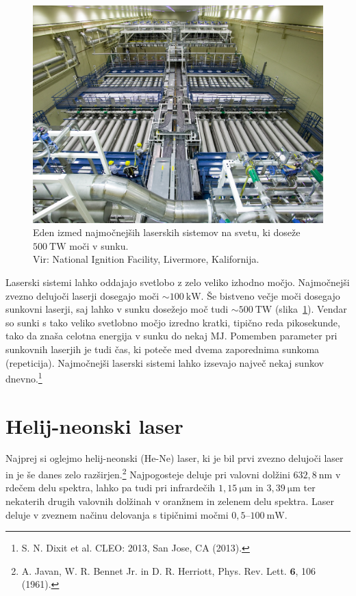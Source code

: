 \begin{figure}[ht]
\centering
\includegraphics[width=80truemm]{slike/07_NIF_Laser_Bay.jpg}
\caption{Eden izmed najmočnejših laserskih sistemov na svetu, ki doseže 
$500~\si{\tera\watt}$ moči v sunku. \\Vir: National Ignition Facility, Livermore, Kalifornija.}
\label{fig:NIF}
\end{figure}

Laserski sistemi lahko oddajajo svetlobo z zelo veliko izhodno močjo. 
Najmočnejši zvezno delujoči laserji dosegajo moči 
$\sim 100~\si{\kilo\watt}$. Še bistveno večje moči dosegajo sunkovni laserji, 
saj lahko v sunku dosežejo moč tudi $\sim 500~\si{\tera\watt}$ (slika~\ref{fig:NIF}). 
Vendar so sunki s tako veliko svetlobno močjo izredno kratki, tipično reda pikosekunde, tako da
znaša celotna energija v sunku do nekaj $\si{\mega\joule}$. Pomemben
parameter pri sunkovnih laserjih je tudi čas, ki poteče med dvema zaporednima
sunkoma (repeticija). Najmočnejši laserski sistemi lahko izsevajo največ nekaj sunkov 
dnevno.\footnote{S. N. Dixit et al. CLEO: 2013, San Jose, CA (2013).}

\section{Helij-neonski laser}
Najprej si oglejmo helij-neonski (He-Ne) laser, ki je bil prvi zvezno 
delujoči laser in je še danes zelo razširjen.\footnote{A. Javan, W. R. Bennet Jr. in 
D. R. Herriott, Phys. Rev. Lett. $\mathbf{6}$, 106 (1961).} Najpogosteje deluje 
pri valovni dolžini $632,8~\si{\nano\metre}$ v rdečem delu spektra, lahko 
pa tudi pri infrardečih $1,15~\si{\micro\metre}$ in 
$3,39~\si{\micro\metre}$ ter nekaterih drugih
valovnih dolžinah v oranžnem in zelenem delu spektra. Laser deluje v zveznem 
načinu delovanja s tipičnimi močmi $0,5$--$100~\si{\milli\watt}$. 


